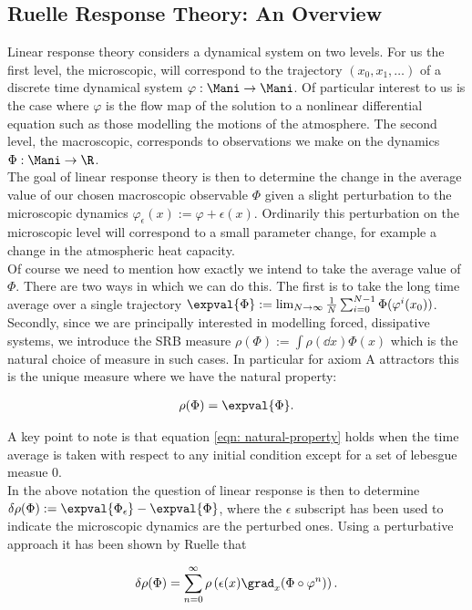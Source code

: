 \subsection{Ruelle Response Theory: An Overview}

Linear response theory considers a dynamical system on two levels. For us the first level, the microscopic, will correspond to the trajectory $(x_0, x_1, \ldots )$ of a discrete time dynamical system $\varphi : \Mani \to \Mani$. Of particular interest to us is the case where $\varphi$ is the flow map of the solution to a nonlinear differential equation such as those modelling the motions of the atmosphere. The second level, the macroscopic, corresponds to observations we make on the dynamics $\Phi : \Mani \to \R$.\\

The goal of linear response theory is then to determine the change in the average value of our chosen macroscopic observable $\Phi$ given a slight perturbation to the microscopic dynamics $\varphi_{\epsilon}(x) := \varphi + \epsilon(x)$. Ordinarily this perturbation on the microscopic level will correspond to a small parameter change, for example a change in the atmospheric heat capacity.\\

Of course we need to mention how exactly we intend to take the average value of $\Phi$. There are two ways in which we can do this. The first is to take the long time average over a single trajectory $ \expval{\Phi} := \lim_{N \to \infty}\frac{1}{N} \sum_{i = 0} ^{N - 1} \Phi(\varphi ^i(x_0))$. Secondly, since we are principally interested in modelling forced, dissipative systems, we introduce the SRB measure $\rho(\Phi) := \int \rho(\dd x) \Phi(x)$ which is the natural choice of measure in such cases. In particular for axiom A attractors this is the unique measure where we have the natural property:

\begin{align}
    \rho(\Phi) = \expval{\Phi}. \label{eqn: natural-property}
\end{align}

A key point to note is that equation \ref{eqn: natural-property} holds when the time average is taken with respect to any initial condition except for a set of lebesgue measue $0$.\\

In the above notation the question of linear response is then to determine $\delta \rho(\Phi) := \expval{\Phi _\epsilon} - \expval{\Phi}$,
where the $\epsilon$ subscript has been used to indicate the microscopic dynamics are the perturbed ones. Using a perturbative approach it has been shown by Ruelle \cite{Ruelle1997a} \cite{Ruelle2009} that

\begin{align}
     \delta \rho(\Phi) = \sum_{n = 0}^\infty \rho \left( \epsilon(x)\grad _x (\Phi \circ \varphi^n) \right). \label{eqn: Ruelle Formula}
\end{align}
